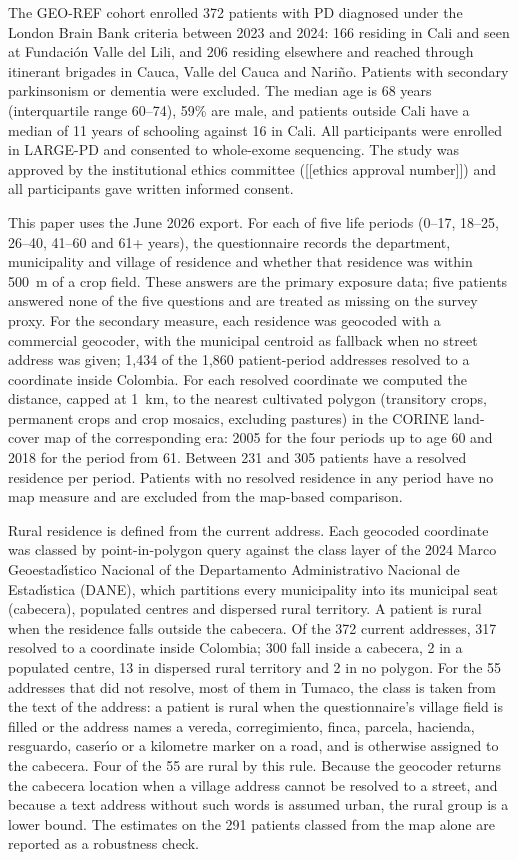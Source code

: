 \documentclass[11pt,a4paper]{article}
\begin{document}
The GEO-REF cohort enrolled 372 patients with PD diagnosed under the London Brain Bank criteria between 2023 and 2024: 166 residing in Cali and seen at Fundaci\'on Valle del Lili, and 206 residing elsewhere and reached through itinerant brigades in Cauca, Valle del Cauca and Nari\~no. Patients with secondary parkinsonism or dementia were excluded. The median age is 68 years (interquartile range 60--74), 59\% are male, and patients outside Cali have a median of 11 years of schooling against 16 in Cali. All participants were enrolled in LARGE-PD and consented to whole-exome sequencing. The study was approved by the institutional ethics committee ([[ethics approval number]]) and all participants gave written informed consent.

This paper uses the June 2026 export. For each of five life periods (0--17, 18--25, 26--40, 41--60 and 61+ years), the questionnaire records the department, municipality and village of residence and whether that residence was within 500~m of a crop field. These answers are the primary exposure data; five patients answered none of the five questions and are treated as missing on the survey proxy. For the secondary measure, each residence was geocoded with a commercial geocoder, with the municipal centroid as fallback when no street address was given; 1,434 of the 1,860 patient-period addresses resolved to a coordinate inside Colombia. For each resolved coordinate we computed the distance, capped at 1~km, to the nearest cultivated polygon (transitory crops, permanent crops and crop mosaics, excluding pastures) in the CORINE land-cover map of the corresponding era: 2005 for the four periods up to age 60 and 2018 for the period from 61. Between 231 and 305 patients have a resolved residence per period. Patients with no resolved residence in any period have no map measure and are excluded from the map-based comparison.

Rural residence is defined from the current address. Each geocoded coordinate was classed by point-in-polygon query against the class layer of the 2024 Marco Geoestad\'{\i}stico Nacional of the Departamento Administrativo Nacional de Estad\'{\i}stica (DANE), which partitions every municipality into its municipal seat (cabecera), populated centres and dispersed rural territory. A patient is rural when the residence falls outside the cabecera. Of the 372 current addresses, 317 resolved to a coordinate inside Colombia; 300 fall inside a cabecera, 2 in a populated centre, 13 in dispersed rural territory and 2 in no polygon. For the 55 addresses that did not resolve, most of them in Tumaco, the class is taken from the text of the address: a patient is rural when the questionnaire's village field is filled or the address names a vereda, corregimiento, finca, parcela, hacienda, resguardo, caser\'{\i}o or a kilometre marker on a road, and is otherwise assigned to the cabecera. Four of the 55 are rural by this rule. Because the geocoder returns the cabecera location when a village address cannot be resolved to a street, and because a text address without such words is assumed urban, the rural group is a lower bound. The estimates on the 291 patients classed from the map alone are reported as a robustness check.
\end{document}
